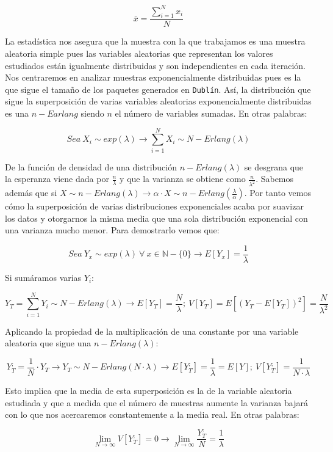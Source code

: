 \documentclass{article}[10pt]
\begin{document}
		$$\bar{x} = \frac{\sum_{i = 1}^N x_i}{N}$$

		La estadística nos asegura que la muestra con la que trabajamos es una muestra aleatoria simple pues las variables aleatorias que representan los valores estudiados están igualmente distribuidas y son independientes en cada iteración. Nos centraremos en analizar muestras exponencialmente distribuidas pues es la que sigue el tamaño de los paquetes generados en \texttt{Dublín}. Así, la distribución que sigue la superposición de varias variables aleatorias exponencialmente distribuidas es una $n-Earlang$ siendo $n$ el número de variables sumadas. En otras palabras:

		$$Sea\ X_i \sim exp(\lambda) \rightarrow \sum_{i = 1}^N X_i \sim N-Erlang(\lambda)$$

		De la función de densidad de una distribución $n-Erlang(\lambda)$ se desgrana que la esperanza viene dada por $\frac{n}{\lambda}$ y que la varianza se obtiene como $\frac{n}{\lambda^2}$. Sabemos además que si $X \sim n-Erlang(\lambda) \rightarrow \alpha \cdot X \sim n-Erlang(\frac{\lambda}{\alpha})$. Por tanto vemos cómo la superposición de varias distribuciones exponenciales acaba por suavizar los datos y otorgarnos la misma media que una sola distribución exponencial con una varianza mucho menor. Para demostrarlo vemos que:

		$$Sea\ Y_x \sim exp(\lambda)\ \forall\ x \in \mathbb{N} - \{0\} \rightarrow E[Y_x] = \frac{1}{\lambda}$$

		Si sumáramos varias $Y_i$:

		$$Y_T = \sum_{i = 1}^N Y_i \sim N-Erlang(\lambda) \rightarrow E[Y_T] = \frac{N}{\lambda};\ V[Y_T] = E[(Y_T - E[Y_T])^2] = \frac{N}{\lambda^2}$$

		Aplicando la propiedad de la multiplicación de una constante por una variable aleatoria que sigue una $n-Erlang(\lambda)$:

		$$Y_T^, = \frac{1}{N} \cdot Y_T \rightarrow Y_T \sim N-Erlang(N \cdot \lambda) \rightarrow E[Y_T^,] = \frac{1}{\lambda} = E[Y];\ V[Y_T^,] = \frac{1}{N \cdot \lambda}$$

		Esto implica que la media de esta superposición es la de la variable aleatoria estudiada y que a medida que el número de muestras aumente la varianza bajará con lo que nos acercaremos constantemente a la media real. En otras palabras:

		$$\lim_{N \to \infty} V[Y_T^,] = 0 \rightarrow \lim_{N \to \infty} \frac{Y_T^,}{N} = \frac{1}{\lambda}$$
\end{document}
